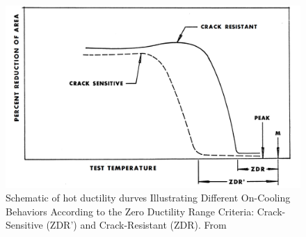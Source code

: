\begin{figure}
\centering
\includegraphics[width=6.5in]{figures/zdr-schematic.png}
\caption{Schematic of hot ductility durves Illustrating Different On-Cooling Behaviors According to the Zero Ductility Range Criteria: Crack-Sensitive (ZDR') and Crack-Resistant (ZDR).  From \citet[Fig.~4]{yeniscavich_correlation_1970}}
\label{fig:zdr-schematic}
\end{figure}


